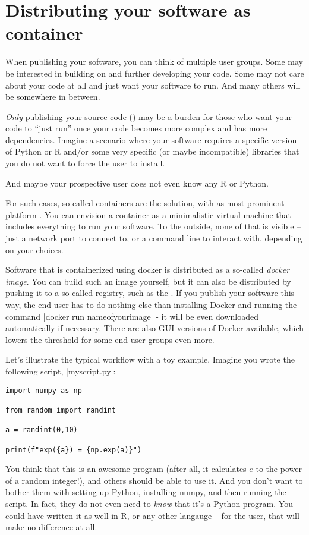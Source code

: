 \section{Distributing your software as container}
\label{sec:container}
When publishing your software, you can think of multiple user
groups. Some may be interested in building on and further developing
your code. Some may not care about your code at all and just want your
software to run. And many others will be somewhere in between.

\emph{Only} publishing your source code () may
be a burden for those who want your code to ``just run'' once your
code becomes more complex and has more dependencies. Imagine a
scenario where your software requires a specific version of
Python or R and/or some very specific (or maybe incompatible) libraries
that you do not want to force the user to install.

And maybe your prospective user does not even know any R or Python.

For such cases, so-called containers are the solution, with as most
prominent platform . You can envision a container as a
minimalistic virtual machine that includes everything to run your
software. To the outside, none of that is visible -- just a network
port to connect to, or a command line to interact with, depending on
your choices.

Software that is containerized using docker is distributed as a
so-called \emph{docker image}. You can build such an image yourself,
but it can also be distributed by pushing it to a so-called registry,
such as the . If you publish your software this
way, the end user has to do nothing else than installing Docker and
running the command |docker run nameofyourimage| - it will be even
downloaded automatically if necessary. There are also GUI versions
of Docker available, which lowers the threshold for some end user
groups even more.

Let's illustrate the typical workflow with a toy example. Imagine
you wrote the following script, |myscript.py|:

\begin{verbatim}
import numpy as np

from random import randint

a = randint(0,10)

print(f"exp({a}) = {np.exp(a)}")
\end{verbatim}

You think that this is an awesome program (after all, it calculates
$e$ to the power of a random integer!), and others should be able
to use it. And you don't want to bother them with setting up Python,
installing numpy, and then running the script. In fact, they do
not even need to \emph{know} that it's a Python program. You
could have written it as well in R, or any other langauge -- for
the user, that will make no difference at all.

